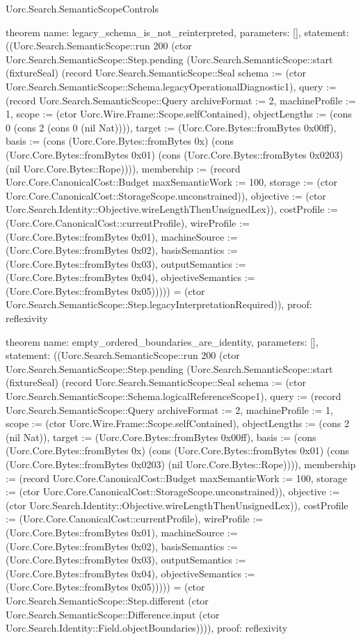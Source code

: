 \begin{lexlean}{Uorc.Search.SemanticScopeControls}
\begin{semanticmodule}
theorem{
  name: legacy_schema_is_not_reinterpreted,
  parameters: [],
  statement: ((Uorc.Search.SemanticScope::run 200 (ctor Uorc.Search.SemanticScope::Step.pending (Uorc.Search.SemanticScope::start (fixtureSeal) (record Uorc.Search.SemanticScope::Seal {schema := (ctor Uorc.Search.SemanticScope::Schema.legacyOperationalDiagnostic1), query := (record Uorc.Search.SemanticScope::Query {archiveFormat := 2, machineProfile := 1, scope := (ctor Uorc.Wire.Frame::Scope.selfContained), objectLengths := (cons 0 (cons 2 (cons 0 (nil Nat)))), target := (Uorc.Core.Bytes::fromBytes 0x00ff), basis := (cons (Uorc.Core.Bytes::fromBytes 0x) (cons (Uorc.Core.Bytes::fromBytes 0x01) (cons (Uorc.Core.Bytes::fromBytes 0x0203) (nil Uorc.Core.Bytes::Rope)))), membership := (record Uorc.Core.CanonicalCost::Budget {maxSemanticWork := 100, storage := (ctor Uorc.Core.CanonicalCost::StorageScope.unconstrained)}), objective := (ctor Uorc.Search.Identity::Objective.wireLengthThenUnsignedLex)}), costProfile := (Uorc.Core.CanonicalCost::currentProfile), wireProfile := (Uorc.Core.Bytes::fromBytes 0x01), machineSource := (Uorc.Core.Bytes::fromBytes 0x02), basisSemantics := (Uorc.Core.Bytes::fromBytes 0x03), outputSemantics := (Uorc.Core.Bytes::fromBytes 0x04), objectiveSemantics := (Uorc.Core.Bytes::fromBytes 0x05)})))) = (ctor Uorc.Search.SemanticScope::Step.legacyInterpretationRequired)),
  proof: reflexivity{}
}

theorem{
  name: empty_ordered_boundaries_are_identity,
  parameters: [],
  statement: ((Uorc.Search.SemanticScope::run 200 (ctor Uorc.Search.SemanticScope::Step.pending (Uorc.Search.SemanticScope::start (fixtureSeal) (record Uorc.Search.SemanticScope::Seal {schema := (ctor Uorc.Search.SemanticScope::Schema.logicalReferenceScope1), query := (record Uorc.Search.SemanticScope::Query {archiveFormat := 2, machineProfile := 1, scope := (ctor Uorc.Wire.Frame::Scope.selfContained), objectLengths := (cons 2 (nil Nat)), target := (Uorc.Core.Bytes::fromBytes 0x00ff), basis := (cons (Uorc.Core.Bytes::fromBytes 0x) (cons (Uorc.Core.Bytes::fromBytes 0x01) (cons (Uorc.Core.Bytes::fromBytes 0x0203) (nil Uorc.Core.Bytes::Rope)))), membership := (record Uorc.Core.CanonicalCost::Budget {maxSemanticWork := 100, storage := (ctor Uorc.Core.CanonicalCost::StorageScope.unconstrained)}), objective := (ctor Uorc.Search.Identity::Objective.wireLengthThenUnsignedLex)}), costProfile := (Uorc.Core.CanonicalCost::currentProfile), wireProfile := (Uorc.Core.Bytes::fromBytes 0x01), machineSource := (Uorc.Core.Bytes::fromBytes 0x02), basisSemantics := (Uorc.Core.Bytes::fromBytes 0x03), outputSemantics := (Uorc.Core.Bytes::fromBytes 0x04), objectiveSemantics := (Uorc.Core.Bytes::fromBytes 0x05)})))) = (ctor Uorc.Search.SemanticScope::Step.different (ctor Uorc.Search.SemanticScope::Difference.input (ctor Uorc.Search.Identity::Field.objectBoundaries)))),
  proof: reflexivity{}
}


\end{semanticmodule}
\end{lexlean}
